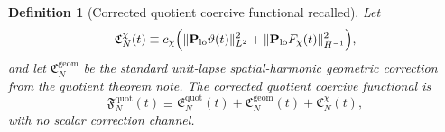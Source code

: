 \documentclass[11pt]{article}
\newtheorem{definition}{Definition}
\begin{document}
\begin{definition}[Corrected quotient coercive functional recalled]
\label{def:Fquot}
Let
\begin{equation}
\mathfrak C_N^\chi(t)
\equiv
c_\chi
\Bigl(
\|\mathbf P_{\mathrm{lo}}\vartheta(t)\|_{L^2}^2
+\|\mathbf P_{\mathrm{lo}}F_\chi(t)\|_{\dot H^{-1}}^2
\Bigr),
\label{eq:Cchi}
\end{equation}
and let \(\mathfrak C_N^{\mathrm{geom}}\) be the standard unit-lapse spatial-harmonic geometric correction from the quotient theorem note. The corrected quotient coercive functional is
\begin{equation}
\mathfrak F_N^{\mathrm{quot}}(t)
\equiv
\mathfrak E_N^{\mathrm{quot}}(t)
+\mathfrak C_N^{\mathrm{geom}}(t)
+\mathfrak C_N^\chi(t),
\label{eq:Fquot}
\end{equation}
with no scalar correction channel.
\end{definition}
\end{document}
